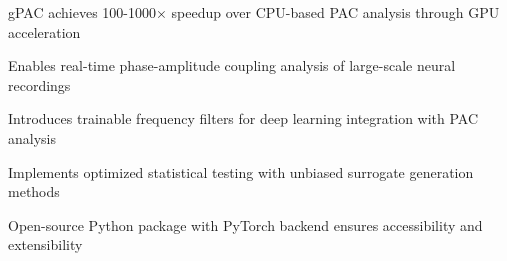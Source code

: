 \begin{highlights}

\item gPAC achieves 100-1000× speedup over CPU-based PAC analysis through GPU acceleration

\item Enables real-time phase-amplitude coupling analysis of large-scale neural recordings

\item Introduces trainable frequency filters for deep learning integration with PAC analysis

\item Implements optimized statistical testing with unbiased surrogate generation methods

\item Open-source Python package with PyTorch backend ensures accessibility and extensibility

\end{highlights}
